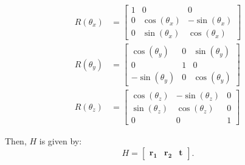 \begin{align}
	R(\theta_x) & =
	\begin{bmatrix}
		1 & 0              & 0               \\
		0 & \cos(\theta_x) & -\sin(\theta_x) \\
		0 & \sin(\theta_x) & \cos(\theta_x)
	\end{bmatrix} \\
	R(\theta_y) & =
	\begin{bmatrix}
		\cos(\theta_y)  & 0 & \sin(\theta_y) \\
		0               & 1 & 0              \\
		-\sin(\theta_y) & 0 & \cos(\theta_y)
	\end{bmatrix} \\
	R(\theta_z) & =
	\begin{bmatrix}
		\cos(\theta_z) & -\sin(\theta_z) & 0 \\
		\sin(\theta_z) & \cos(\theta_z)  & 0 \\
		0              & 0               & 1
	\end{bmatrix}
\end{align}

Then, \(H\) is given by:
\begin{equation}
	H = \begin{bmatrix}
		\mathbf{r_1} & \mathbf{r_2} & \mathbf{t}
	\end{bmatrix}.
\end{equation}

